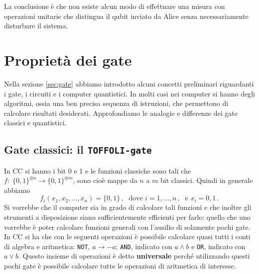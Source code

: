 \noindent La conclusione è che non esiste alcun modo di effettuare una misura con operazioni unitarie che distingua il qubit inviato da Alice senza necessariamente disturbare il sistema. 

\section{Proprietà dei gate}
Nella sezione \ref{sec:gate} abbiamo introdotto alcuni concetti preliminari riguardanti i gate, i circuiti e i computer quantistici. In molti casi nei computer si hanno degli algoritmi, ossia una ben precisa sequenza di istruzioni, che permettono di calcolare risultati desiderati. Approfondiamo le analogie e differenze dei gate classici e quantistici.

\subsection{Gate classici: il \texttt{TOFFOLI-gate}}
In CC si hanno i bit 0 e 1 e le funzioni classiche sono tali che $f: \; \{ 0,1 \}^{\otimes n} \rightarrow \{ 0,1 \}^{\otimes m}$, sono cioè mappe da $n$ a $m$ bit classici. Quindi in generale abbiamo
\begin{equation*}
    f_i(x_1, x_2, \ldots, x_n) = \{ 0, 1 \} \, , \; \text{ dove } i = 1, \ldots , n \, , \; \text{ e } x_i = 0, 1 \, .
\end{equation*}
Si vorrebbe che il computer sia in grado di calcolare tali funzioni e che inoltre gli strumenti a disposizione siano sufficientemente efficienti per farlo: quello che uno vorrebbe è poter calcolare funzioni generali con l'ausilio di solamente pochi gate. In CC si ha che con le seguenti operazioni è possibile calcolare quasi tutti i conti di algebra e aritmetica: \texttt{NOT}, $a \rightarrow -a$; \texttt{AND}, indicato con $a \land b$ e \texttt{OR}, indicato con $a \lor b$. Questo insieme di operazioni è detto \textbf{universale} perché utilizzando questi pochi gate è possibile calcolare tutte le operazioni di aritmetica di interesse. 

